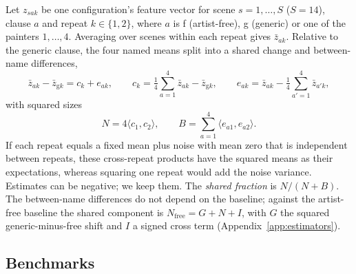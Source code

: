 \documentclass[10pt]{article}
\newcommand{\ip}[2]{\langle #1,#2\rangle}
\begin{document}
Let $z_{sak}$ be one configuration's feature vector for scene $s=1,\dots,S$ ($S=14$), clause $a$
and repeat $k\in\{1,2\}$, where $a$ is f (artist-free), g (generic) or one of the painters
$1,\dots,4$. Averaging over scenes within each repeat gives $\bar z_{ak}$. Relative to the
generic clause, the four named means split into a shared change and between-name differences,
\begin{equation}
\bar z_{ak}-\bar z_{\mathrm{g}k}=c_k+e_{ak},\qquad
c_k=\tfrac14\sum_{a=1}^4\bar z_{ak}-\bar z_{\mathrm{g}k},\qquad
e_{ak}=\bar z_{ak}-\tfrac14\sum_{a'=1}^4\bar z_{a'k},
\label{eq:split}
\end{equation}
with squared sizes
\begin{equation}
N=4\ip{c_1}{c_2},\qquad B=\sum_{a=1}^4\ip{e_{a1}}{e_{a2}}.
\label{eq:components}
\end{equation}
If each repeat equals a fixed mean plus noise with mean zero that is independent between
repeats, these cross-repeat products have the squared means as their expectations, whereas
squaring one repeat would add the noise variance. Estimates can be negative; we keep them. The
\emph{shared fraction} is $N/(N+B)$. The between-name differences do not depend on the baseline;
against the artist-free baseline the shared component is $N_{\mathrm{free}}=G+N+I$, with $G$ the
squared generic-minus-free shift and $I$ a signed cross term (Appendix~\ref{app:estimators}).

\subsection{Benchmarks}\label{sec:benchmarks}
\end{document}
